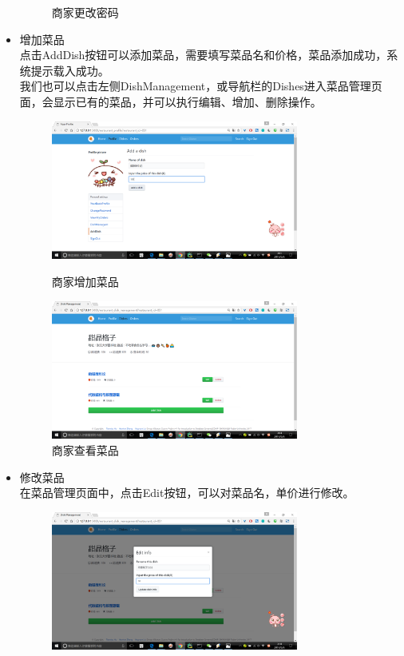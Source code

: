 \documentclass[12pt, oneside,a4paper]{article}
\begin{document}
\begin{itemize}
\begin{figure}[H]
\begin{minipage}[t]{0.5\linewidth}
      \caption{\small{商家更改密码}}
   \end{minipage}
   \end{figure}
  \item 增加菜品\\
  点击AddDish按钮可以添加菜品，需要填写菜品名和价格，菜品添加成功，系统提示载入成功。\\
  我们也可以点击左侧DishManagement，或导航栏的Dishes进入菜品管理页面，会显示已有的菜品，并可以执行编辑、增加、删除操作。
  \begin{figure}[H]
   \begin{minipage}[t]{0.5\linewidth}
    \centering
     \includegraphics[width=3.2in]{re-add.jpg}
     \caption{\small{商家增加菜品}}
   \end{minipage}
   \begin{minipage}[t]{0.5\linewidth}
    \centering
     \includegraphics[width=3.2in]{re-dish.jpg}
      \caption{\small{商家查看菜品}}
   \end{minipage}
   \end{figure}
  \item 修改菜品\\
  在菜品管理页面中，点击Edit按钮，可以对菜品名，单价进行修改。
  \begin{figure}[H]
   \begin{minipage}[t]{0.5\linewidth}
    \centering
     \includegraphics[width=3.2in]{re-update-dish1.jpg}

\end{minipage}
\end{figure}
\end{itemize}
\end{document}
